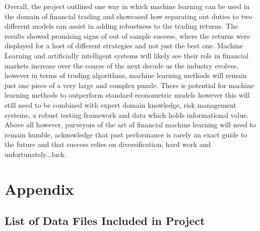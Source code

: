 \documentclass[11pt]{article}
\begin{document}
\par Overall, the project outlined one way in which machine learning can be used in the domain of financial trading and showcased how separating out duties to two different models can assist in adding robustness to the trading returns.  The results showed promising signs of out of sample success, where the returns were displayed for a host of different strategies and not just the best one.
Machine Learning and artificially intelligent systems will likely see their role in financial markets increase over the course of the next decade as the industry evolves, however in terms of trading algorithms, machine learning methods will remain just one piece of a very large and complex puzzle. There is potential for machine learning methods to outperform standard econometric models however this will still need to be combined with expert domain knowledge, risk management systems, a robust testing framework and data which holds informational value. Above all however, purveyors of the art of financial machine learning will need to remain humble, acknowledge that past performance is rarely an exact guide to the future and that success relies on diversification, hard work and unfortunately...luck.
\clearpage

{}
\clearpage

\appendix

\section{Appendix}

\subsection{List of Data Files Included in Project}
\end{document}
